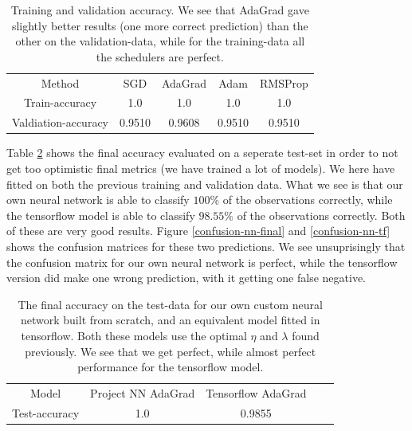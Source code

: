\documentclass{article}
\begin{document}
\begin{table}
      \centering
      \begin{tabular}{| c | c | c | c | c |}
            Method              & SGD    & AdaGrad & Adam   & RMSProp \\
            Train-accuracy      & 1.0    & 1.0     & 1.0    & 1.0     \\
            Valdiation-accuracy & 0.9510 & 0.9608  & 0.9510 & 0.9510  \\
      \end{tabular}
      \caption{Training and validation accuracy. We see that AdaGrad gave
            slightly better results (one more correct prediction) than the other on
            the validation-data, while for the training-data all the schedulers are
            perfect.}
      \label{breastcancer-nn-lr-schedulers}
\end{table}

Table \ref{breastcancer-nn-final-results} shows the final accuracy evaluated on
a seperate test-set in order to not get too optimistic final metrics (we have
trained a lot of models). We here have fitted on both the previous training and
validation data. What we see is that our own neural network is able to classify
$100\%$ of the observations correctly, while the tensorflow model is able to
classify $98.55\%$ of the observations correctly. Both of these are very good
results. Figure \ref{confusion-nn-final} and \ref{confusion-nn-tf} shows the
confusion matrices for these two predictions. We see unsuprisingly that the
confusion matrix for our own neural network is perfect, while the tensorflow
version did make one wrong prediction, with it getting one false
negative.

\begin{table}
      \centering
      \begin{tabular}{| c | c | c | c | c |}
            Model         & Project NN AdaGrad & Tensorflow AdaGrad \\
            Test-accuracy & 1.0                & 0.9855             \\
      \end{tabular}
      \caption{The final accuracy on the test-data for our own custom neural
            network built from scratch, and an equivalent model fitted in tensorflow.
            Both these models use the optimal $\eta$ and $\lambda$ found previously.
            We see that we get perfect, while almost perfect performance for the
            tensorflow model.}
      \label{breastcancer-nn-final-results}
\end{table}
\end{document}
